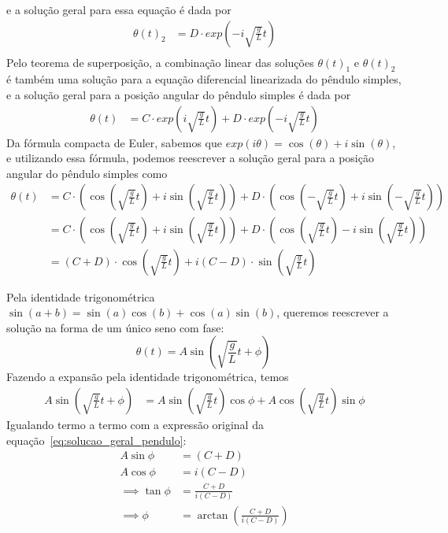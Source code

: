 \documentclass[12pt,a4paper]{article}
\begin{document}
e a solução geral para essa equação é dada por
\begin{align*}
    \theta(t)_{2} &= D\cdot exp\left(-i \sqrt{\frac{g}{L}} t\right) \\
\end{align*}
Pelo teorema de superposição, a combinação linear das soluções $\theta(t)_{1}$ e $\theta(t)_{2}$ é também uma solução para a equação diferencial linearizada do pêndulo simples, e a solução geral para a posição angular do pêndulo simples é dada por
\begin{align*}
    \theta(t) &= C \cdot exp\left(i \sqrt{\frac{g}{L}} t\right) + D \cdot exp\left(-i \sqrt{\frac{g}{L}} t\right)
\end{align*}
Da fórmula compacta de Euler, sabemos que $exp(i \theta) = \cos(\theta) + i \sin(\theta)$, e utilizando essa fórmula, podemos reescrever a solução geral para a posição angular do pêndulo simples como
\begin{align}
    \theta(t) & = C \cdot \left(\cos\left(\sqrt{\frac{g}{L}} t\right) + i \sin\left(\sqrt{\frac{g}{L}} t\right)\right) + D \cdot \left(\cos\left(-\sqrt{\frac{g}{L}} t\right) + i \sin\left(-\sqrt{\frac{g}{L}} t\right)\right) \nonumber \\
    & = C \cdot \left(\cos\left(\sqrt{\frac{g}{L}} t\right) + i \sin\left(\sqrt{\frac{g}{L}} t\right)\right) + D \cdot \left(\cos\left(\sqrt{\frac{g}{L}} t\right) - i \sin\left(\sqrt{\frac{g}{L}} t\right)\right) \nonumber \\
    & = (C + D) \cdot \cos\left(\sqrt{\frac{g}{L}} t\right) + i (C - D) \cdot \sin\left(\sqrt{\frac{g}{L}} t\right) \label{eq:solucao_geral_pendulo}
\end{align}

Pela identidade trigonométrica $\sin(a + b) = \sin(a)\cos(b) + \cos(a)\sin(b)$, queremos reescrever a solução na forma de um único seno com fase:
\begin{equation}
\theta(t) = A\sin\left(\sqrt{\frac{g}{L}} t + \phi\right)~\label{eq:seno_da_fase}
\end{equation}
Fazendo a expansão pela identidade trigonométrica, temos
\begin{align*}
A\sin\left(\sqrt{\frac{g}{L}} t + \phi\right)
&= A\sin\left(\sqrt{\frac{g}{L}} t\right)\cos\phi + A\cos\left(\sqrt{\frac{g}{L}} t\right)\sin\phi
\end{align*}
Igualando termo a termo com a expressão original da equação~\eqref{eq:solucao_geral_pendulo}:
\begin{align}
A\sin\phi &= (C + D) \nonumber \\
A\cos\phi &= i (C - D) \nonumber \\
\implies \tan\phi &= \frac{C + D}{i (C - D)} \nonumber \\
\implies \phi &= \arctan\left(\frac{C + D}{i (C - D)}\right) \nonumber
\end{align}
\end{document}
